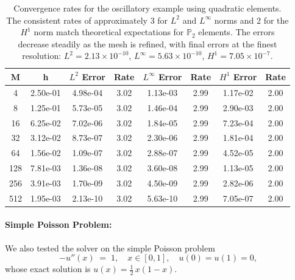 \documentclass[a4paper,10pt]{article}
\begin{document}
\begin{table}[ht]
	\centering
		\begin{tabular}{|c|c|c|c|c|c|c|c|}
			\hline
			\rowcolor{blue!25!white} \textbf{M} & \textbf{h} & \textbf{$L^2$ Error} & \textbf{Rate} & \textbf{$L^\infty$ Error} & \textbf{Rate} & \textbf{$H^1$ Error} & \textbf{Rate} \\
			\hline
			4        & 2.50e-01     & 4.98e-04        & 3.02     & 1.13e-03        & 2.99     & 1.17e-02        & 2.00    \\
			\rowcolor{blue!5!white}
			8        & 1.25e-01     & 5.73e-05        & 3.02     & 1.46e-04        & 2.99     & 2.90e-03        & 2.00    \\
			16       & 6.25e-02     & 7.02e-06        & 3.02     & 1.84e-05        & 2.99     & 7.23e-04        & 2.00    \\
			\rowcolor{blue!5!white}
			32       & 3.12e-02     & 8.73e-07        & 3.02     & 2.30e-06        & 2.99     & 1.81e-04        & 2.00    \\
			64       & 1.56e-02     & 1.09e-07        & 3.02     & 2.88e-07        & 2.99     & 4.52e-05        & 2.00    \\
			\rowcolor{blue!5!white}
			128      & 7.81e-03     & 1.36e-08        & 3.02     & 3.60e-08        & 2.99     & 1.13e-05        & 2.00    \\
			256      & 3.91e-03     & 1.70e-09        & 3.02     & 4.50e-09        & 2.99     & 2.82e-06        & 2.00    \\
			\rowcolor{blue!5!white}
			512      & 1.95e-03     & 2.13e-10        & 3.02     & 5.63e-10        & 2.99     & 7.05e-07        & 2.00    \\
			\hline
		\end{tabular}
		\caption{Convergence rates for the oscillatory example using quadratic elements. The consistent rates of approximately 3 for $L^2$ and $L^\infty$ norms and 2 for the $H^1$ norm match theoretical expectations for $\mathbb{P}_2$ elements. The errors decrease steadily as the mesh is refined, with final errors at the finest resolution: $L^2 = 2.13\times10^{-10}$, $L^\infty = 5.63\times10^{-10}$, $H^1 = 7.05\times10^{-7}$.}
		\label{tab:convergence_fancy}
\end{table}

\paragraph{Simple Poisson Problem:}
We also tested the solver on the simple Poisson problem
\[
	-u''(x) \;=\; 1, \quad x \in [0,1], \quad u(0)=u(1)=0,
\]
whose exact solution is \(u(x) = \tfrac12\,x(1-x)\).
\end{document}
